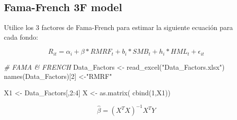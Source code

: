 \documentclass[
  12pt,
]{article}
\newenvironment{Shaded}{\begin{snugshade}}{\end{snugshade}}
\newcommand{\CommentTok}[1]{\textcolor[rgb]{0.56,0.35,0.01}{\textit{#1}}}
\newcommand{\ControlFlowTok}[1]{\textcolor[rgb]{0.13,0.29,0.53}{\textbf{#1}}}
\newcommand{\DecValTok}[1]{\textcolor[rgb]{0.00,0.00,0.81}{#1}}
\newcommand{\FunctionTok}[1]{\textcolor[rgb]{0.00,0.00,0.00}{#1}}
\newcommand{\NormalTok}[1]{#1}
\newcommand{\OtherTok}[1]{\textcolor[rgb]{0.56,0.35,0.01}{#1}}
\newcommand{\SpecialCharTok}[1]{\textcolor[rgb]{0.00,0.00,0.00}{#1}}
\newcommand{\StringTok}[1]{\textcolor[rgb]{0.31,0.60,0.02}{#1}}
\begin{document}
\hypertarget{fama-french-3f-model}{%
\subsection{Fama-French 3F model}\label{fama-french-3f-model}}

Utilice los 3 factores de Fama-French para estimar la siguiente ecuación
para cada fondo:

\[
R_{it}=\alpha_i+\beta \ast RMRF_t +b_i \ast SMB_t +h_i \ast HML_t + \epsilon_{it}
\]

\begin{Shaded}
\begin{Highlighting}[]
\CommentTok{\# FAMA \& FRENCH}
\NormalTok{Data\_Factors }\OtherTok{\textless{}{-}} \FunctionTok{read\_excel}\NormalTok{(}\StringTok{"Data\_Factors.xlsx"}\NormalTok{)}
\FunctionTok{names}\NormalTok{(Data\_Factors)[}\DecValTok{2}\NormalTok{] }\OtherTok{\textless{}{-}}\StringTok{"RMRF"}
\end{Highlighting}
\end{Shaded}

\begin{Shaded}
\end{Shaded}

\begin{Shaded}
\begin{Highlighting}[]
\NormalTok{X1 }\OtherTok{\textless{}{-}}\NormalTok{ Data\_Factors[,}\DecValTok{2}\SpecialCharTok{:}\DecValTok{4}\NormalTok{]}
\NormalTok{X }\OtherTok{\textless{}{-}} \FunctionTok{as.matrix}\NormalTok{( }\FunctionTok{cbind}\NormalTok{(}\DecValTok{1}\NormalTok{,X1))}
\end{Highlighting}
\end{Shaded}

\[
\hat{\beta}=(X^TX)^{-1}X^TY
\]
\end{document}
